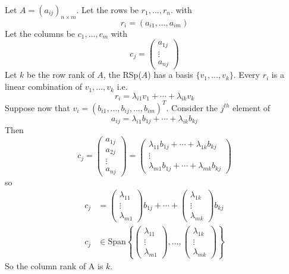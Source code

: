 \documentclass{report}
\theoremstyle{remark}
\theoremstyle{definition}
\theoremstyle{definition}
\theoremstyle{theorem}
\begin{document}
Let $A = (a_{ij})_{n \times m}$. Let the rows be $r_1, ..., r_n$. with 
\[r_i = (a_{i1}, ..., a_{im})\]
Let the columns be $c_1, ..., c_m$ with
\[c_j = \begin{pmatrix}
a_{1j}\\
\vdots\\
a_{nj}
\end{pmatrix}\]
Let $k$ be the row rank of $A$, the RSp($A$) has a basis $\{v_1, ..., v_k\}$. Every $r_i$ is a linear combination of $v_1,...,v_k$ i.e.
\[r_i = \lambda_{i1}v_1 + \cdots + \lambda_{ik}v_k\]
Suppose now that $v_i = (b_{i1}, ..., b_{ij}, ..., b_{im})^T$. Consider the $j^{th}$ element of 
\[a_{ij} = \lambda_{i1}b_{1j} + \cdots + \lambda_{ik}b_{kj}\]
Then
\[ c_j = \begin{pmatrix}
a_{1j}\\
a_{2j}\\
\vdots\\
a_{nj}
\end{pmatrix} = \begin{pmatrix}
\lambda_{11}b_{1j} + \cdots + \lambda_{1k}b_{kj}\\
\vdots\\
\lambda_{m1}b_{1j} + \cdots + \lambda_{mk}b_{kj}
\end{pmatrix}\]
so
\begin{align*}
    c_j &= \begin{pmatrix}
    \lambda_{11}\\
    \vdots\\
    \lambda_{m1}
    \end{pmatrix} b_{1j} + \cdots + \begin{pmatrix}
    \lambda_{1k}\\
    \vdots\\
    \lambda_{mk}
    \end{pmatrix}b_{kj}\\
    c_j &\in \text{Span}\left\{\begin{pmatrix}
    \lambda_{11}\\
    \vdots\\
    \lambda_{m1}
    \end{pmatrix}, ..., \begin{pmatrix}
    \lambda_{1k}\\
    \vdots\\
    \lambda_{mk}
    \end{pmatrix} \right\}
\end{align*}
So the column rank of A is $k$.
\end{document}
